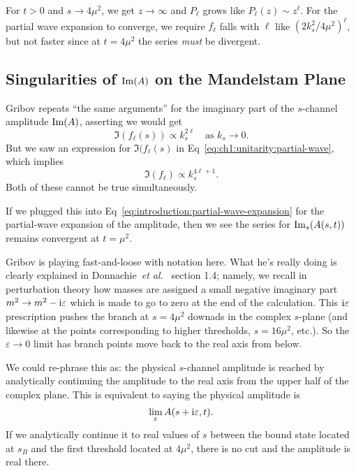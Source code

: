 \M
For $t>0$ and $s\to4\mu^{2}$, we get $z\to\infty$ and $P_{\ell}$ grows
like $P_{\ell}(z)\sim z^{\ell}$. For the partial wave expansion to
converge, we require $f_{\ell}$ falls with $\ell$ like
$(2k_{s}^{2}/4\mu^{2})^{\ell}$, but not faster since at $t=4\mu^{2}$ the
series \emph{must} be divergent.

\smallbreak
\subsection{Singularities of \texorpdfstring{$\operatorname{Im}(A)$}{Im(A)} on the Mandelstam Plane}

 Gribov repeats ``the same arguments'' for the imaginary part of
the $s$-channel amplitude $\operatorname{Im}(A)$, asserting we would get
\begin{equation}
\Im(f_{\ell}(s))\propto k_{s}^{2\ell}\quad\mbox{as } k_{s}\to0.
\end{equation}
But we saw an expression for $\Im(f_{\ell}(s)$ in Eq~\eqref{eq:ch1:unitarity:partial-wave},
which implies
\begin{equation}
\Im(f_{\ell})\propto k_{s}^{4\ell+1}.
\end{equation}
Both of these cannot be true simultaneously.

\M[1]
If we plugged this into Eq~\eqref{eq:introduction:partial-wave-expansion}
for the partial-wave expansion of the amplitude, then we see the series
for $\operatorname{Im}_{s}(A(s,t))$ remains convergent at $t=\mu^{2}$.

Gribov is playing fast-and-loose with notation here. What he's really
doing is clearly explained in Donnachie~\textit{et al.}~\cite{Donnachie:2002en}
section 1.4; namely, we recall in perturbation theory how masses are
assigned a small negative imaginary part $m^{2}\to m^{2}-\mathrm{i}\varepsilon$
which is made to go to zero at the end of the calculation.
This $\mathrm{i}\varepsilon$ prescription pushes the branch at $s=4\mu^{2}$
downads in the complex $s$-plane (and likewise at the points
corresponding to higher thresholds, $s=16\mu^{2}$, etc.). So the
$\varepsilon\to0$ limit has branch points move back to the real axis
from below.

We could re-phrase this as: the physical $s$-channel amplitude is reached
by analytically continuing the amplitude to the real axis from the upper
half of the complex plane. This is equivalent to saying the physical
amplitude is
\begin{equation}
\lim_{\varepsilon}A(s+\mathrm{i}\varepsilon,t).
\end{equation}
If we analytically continue it to real values of $s$ between the bound
state located at $s_{B}$ and the first threshold located at $4\mu^{2}$,
there is no cut and the amplitude is real there.

